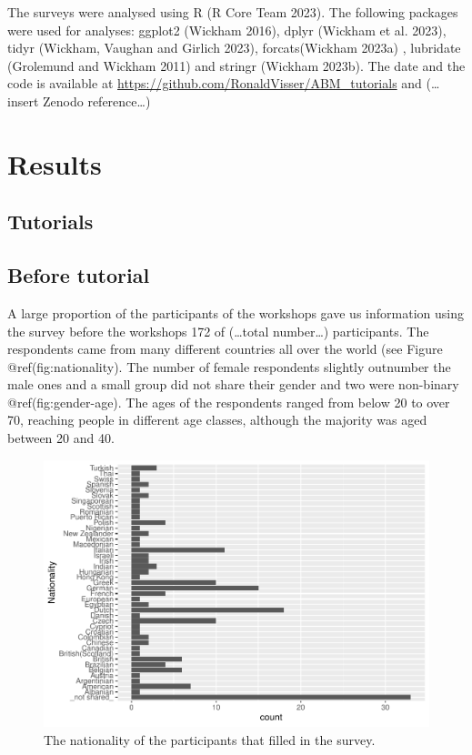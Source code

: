 \documentclass[
]{article}
\begin{document}
The surveys were analysed using R (R Core Team 2023). The following
packages were used for analyses: ggplot2 (Wickham 2016), dplyr (Wickham
et al. 2023), tidyr (Wickham, Vaughan and Girlich 2023), forcats(Wickham
2023a) , lubridate (Grolemund and Wickham 2011) and stringr (Wickham
2023b). The date and the code is available at
\url{https://github.com/RonaldVisser/ABM_tutorials} and (\ldots{} insert
Zenodo reference\ldots)

\hypertarget{results}{%
\section{Results}\label{results}}

\hypertarget{tutorials}{%
\subsection{Tutorials}\label{tutorials}}

\hypertarget{before-tutorial}{%
\subsection{Before tutorial}\label{before-tutorial}}

A large proportion of the participants of the workshops gave us
information using the survey before the workshops 172 of (\ldots total
number\ldots) participants. The respondents came from many different
countries all over the world (see Figure @ref(fig:nationality). The
number of female respondents slightly outnumber the male ones and a
small group did not share their gender and two were non-binary
@ref(fig:gender-age). The ages of the respondents ranged from below 20
to over 70, reaching people in different age classes, although the
majority was aged between 20 and 40.

\begin{figure}
\centering
\includegraphics{paper_files/figure-latex/nationality-1.pdf}
\caption{The nationality of the participants that filled in the survey.}
\end{figure}
\end{document}

